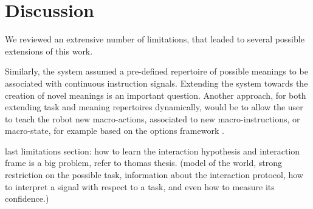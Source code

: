 \section{Discussion}
\label{chapter:limitations:discussion}

We reviewed an extrensive number of limitations, that leaded to several possible extensions of this work.






Similarly, the system assumed a pre-defined repertoire of possible meanings to be associated with continuous instruction signals. Extending the system towards the creation of novel meanings is an important question. Another approach, for both extending task and meaning repertoires dynamically, would be to allow the user to teach the robot new macro-actions, associated to new macro-instructions, or macro-state, for example based on the options framework \cite{sutton1999between}.

last limitations section: how to learn the interaction hypothesis and interaction frame is a big problem, refer to thomas thesis. (model of the world, strong restriction on the possible task, information about the interaction protocol, how to interpret a signal with respect to a task, and even how to measure its confidence.)
